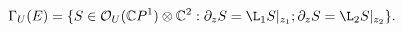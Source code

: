 \begin{equation}\label{lin}
 \Gamma_U(E)=\{S\in\mathcal{O}_U(\mathbb{C}P^1)\otimes
\mathbb{C}^2 :\partial_z S=\L_1 S|_{z_1};\partial_z S=\L_2
S|_{z_2}\}.
\end{equation}

